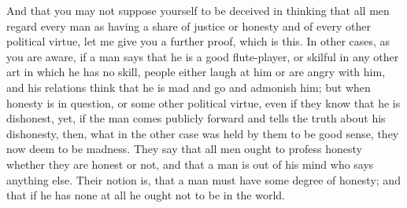 \documentclass[11pt,letter]{article}
\begin{document}
\par  And that you may not suppose yourself to be deceived in thinking that all men regard every man as having a share of justice or honesty and of every other political virtue, let me give you a further proof, which is this. In other cases, as you are aware, if a man says that he is a good flute-player, or skilful in any other art in which he has no skill, people either laugh at him or are angry with him, and his relations think that he is mad and go and admonish him; but when honesty is in question, or some other political virtue, even if they know that he is dishonest, yet, if the man comes publicly forward and tells the truth about his dishonesty, then, what in the other case was held by them to be good sense, they now deem to be madness. They say that all men ought to profess honesty whether they are honest or not, and that a man is out of his mind who says anything else. Their notion is, that a man must have some degree of honesty; and that if he has none at all he ought not to be in the world.
\end{document}
